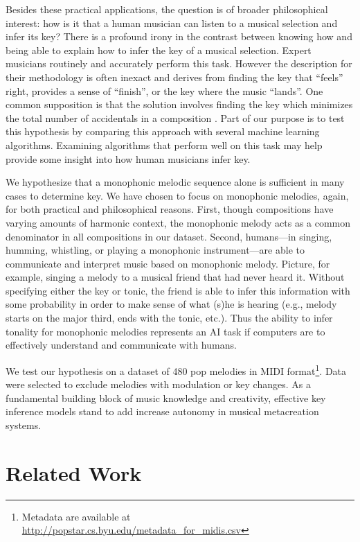 \documentclass[letterpaper]{article}
\begin{document}
Besides these practical applications, the question is of broader philosophical interest: how is it that a human musician can listen to a musical selection and infer its key? There is a profound irony in the contrast between knowing how and being able to explain how to infer the key of a musical selection. Expert musicians routinely and accurately perform this task. However the description for their methodology is often inexact and derives from finding the key that ``feels'' right, provides a sense of ``finish'', or the key where the music ``lands''. One common supposition is that the solution involves finding the key which minimizes the total number of accidentals in a composition \cite{gorow2011hearing}. Part of our purpose is to test this hypothesis by comparing this approach with several machine learning algorithms. Examining algorithms that perform well on this task may help provide some insight into how human musicians infer key.

We hypothesize that a monophonic melodic sequence alone is sufficient in many cases to determine key. We have chosen to focus on monophonic melodies, again, for both practical and philosophical reasons. First, though compositions have varying amounts of harmonic context, the monophonic melody acts as a common denominator in all compositions in our dataset. Second, humans---in singing, humming, whistling, or playing a monophonic instrument---are able to communicate and interpret music based on monophonic melody. Picture, for example, singing a melody to a musical friend that had never heard it. Without specifying either the key or tonic, the friend is able to infer this information with some probability in order to make sense of what (s)he is hearing (e.g., melody starts on the major third, ends with the tonic, etc.). Thus the ability to infer tonality for monophonic melodies represents an AI task if computers are to effectively understand and communicate with humans.

We test our hypothesis on a dataset of 480 pop melodies in MIDI format\footnote{Metadata are available at \url{http://popstar.cs.byu.edu/metadata_for_midis.csv}}. Data were selected to exclude melodies with modulation or key changes. As a fundamental building block of music knowledge and creativity, effective key inference models stand to add increase autonomy in musical metacreation systems.

\section{Related Work}
\end{document}
